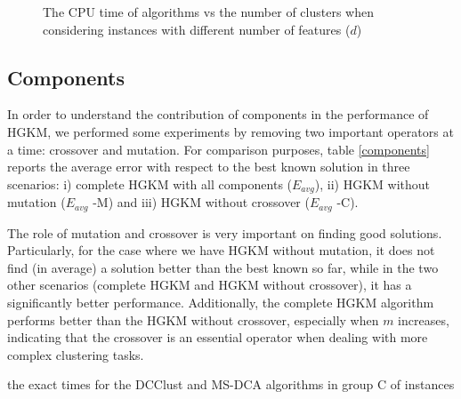 \begin{figure}[H]
\centering
{}
\caption{The CPU time of algorithms vs the number of clusters when considering instances with different number of features ($d$)}
\label{fig:dimen}
\end{figure}

\subsection{Components}
\label{sec:components}
In order to understand the contribution of components in the performance of HGKM, we performed some experiments by removing two important operators at a time: crossover and mutation. For comparison purposes, table \ref{components} reports the average error with respect to the best known solution in three scenarios: i) complete HGKM with all components ($E_{avg}$), ii) HGKM without mutation ($E_{avg}$ -M) and iii) HGKM without crossover ($E_{avg}$ -C).



The role of mutation and crossover is very important on finding good solutions. Particularly, for the case where we have HGKM without mutation, it does not find (in average) a solution better than the best known so far, while in the two other scenarios (complete HGKM and HGKM without crossover), it has a significantly better performance. Additionally, the complete HGKM algorithm performs better than the HGKM without crossover, especially when $m$ increases, indicating that the crossover is an essential operator when dealing with more complex clustering tasks.

\noindent [TO-DO] the exact times for the DCClust and MS-DCA algorithms in group C of instances

